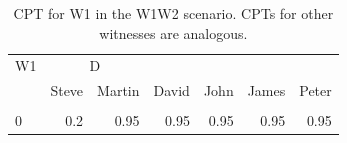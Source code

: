 \documentclass[10pt,]{scrartcl}
\begin{document}

\begin{table}[H]
\centering
\begin{tabular}{lrrrrrr}
\toprule
\multicolumn{1}{c}{W1} & \multicolumn{2}{c}{D} \\
  & Steve & Martin & David & John & James & Peter\\
\midrule
\cellcolor{gray!6}{\cellcolor{gray!6}{1}} & \cellcolor{gray!6}{\cellcolor{gray!6}{0.8}} & \cellcolor{gray!6}{\cellcolor{gray!6}{0.05}} & \cellcolor{gray!6}{\cellcolor{gray!6}{0.05}} & \cellcolor{gray!6}{\cellcolor{gray!6}{0.05}} & \cellcolor{gray!6}{\cellcolor{gray!6}{0.05}} & \cellcolor{gray!6}{\cellcolor{gray!6}{0.05}}\\
0 & 0.2 & 0.95 & 0.95 & 0.95 & 0.95 & 0.95\\
\bottomrule
\end{tabular}
\caption{CPT for \textsf{W1} in the \textsf{W1W2} scenario. CPTs for other witnesses are  analogous.}
\label{tab:w1w2}
\end{table}


\end{document}
